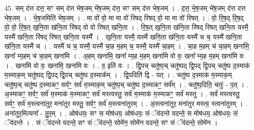 \documentclass[17pt]{extarticle}
\begin{document}
45. सम् द॑त्त दत्त॒ सꣳ सम् द॑त्त भेष॒जम् भे॑ष॒जम् द॑त्त॒ सꣳ सम् द॑त्त भेष॒जम् । . द॒त्त॒ भे॒ष॒जम् भे॑ष॒जम् द॑त्त दत्त भेष॒जम् । . भे॒ष॒जमिति॑ भेष॒जम् । . मा वो॑ वो॒ मा मा वो॑ रिषद् रिषद् वो॒ मा मा वो॑ रिषत् । . वो॒ रि॒ष॒द् रि॒ष॒द् वो॒ वो॒ रि॒ष॒त् ख॒नि॒ता ख॑नि॒ता रि॑षद् वो वो रिषत् खनि॒ता । . रि॒ष॒त् ख॒नि॒ता ख॑नि॒ता रि॑षद् रिषत् खनि॒ता यस्मै॒ यस्मै॑ खनि॒ता रि॑षद् रिषत् खनि॒ता यस्मै᳚ । . ख॒नि॒ता यस्मै॒ यस्मै॑ खनि॒ता ख॑नि॒ता यस्मै॑ च च॒ यस्मै॑ खनि॒ता ख॑नि॒ता यस्मै॑ च । . यस्मै॑ च च॒ यस्मै॒ यस्मै॑ चा॒ह म॒हम् च॒ यस्मै॒ यस्मै॑ चा॒हम् । . चा॒ह म॒हम् च॑ चा॒हम् खना॑मि॒ खना᳚ म्य॒हम् च॑ चा॒हम् खना॑मि । . अ॒हम् खना॑मि॒ खना᳚ म्य॒ह म॒हम् खना॑मि वो वः॒ खना᳚ म्य॒ह म॒हम् खना॑मि वः । . खना॑मि वो वः॒ खना॑मि॒ खना॑मि वः । . व॒ इति॑ वः । . द्वि॒पच् चतु॑ष्प॒च् चतु॑ष्पद् द्वि॒पद् द्वि॒पच् चतु॑ष्प द॒स्माक॑ म॒स्माक॒म् चतु॑ष्पद् द्वि॒पद् द्वि॒पच् चतु॑ष्प द॒स्माक᳚म् । . द्वि॒पदिति॑ द्वि - पत् । . चतु॑ष्प द॒स्माक॑ म॒स्माक॒म् चतु॑ष्प॒च् चतु॑ष्प द॒स्माकꣳ॒॒ सर्वꣳ॒॒ सर्व॑ म॒स्माक॒म् चतु॑ष्प॒च् चतु॑ष्प द॒स्माकꣳ॒॒ सर्व᳚म् । . चतु॑ष्प॒दिति॒ चतुः॑ - प॒त् । . अ॒स्माकꣳ॒॒ सर्वꣳ॒॒ सर्व॑ म॒स्माक॑ म॒स्माकꣳ॒॒ सर्व॑ मस्त्वस्तु॒ सर्व॑ म॒स्माक॑ म॒स्माकꣳ॒॒ सर्व॑ मस्तु । . सर्व॑ मस्त्वस्तु॒ सर्वꣳ॒॒ सर्व॑ म॒स्त्वना॑तुर॒ मना॑तुर मस्तु॒ सर्वꣳ॒॒ सर्व॑ म॒स्त्वना॑तुरम् । . अ॒स्त्वना॑तुर॒ मना॑तुर मस्त्व॒ स्त्वना॑तुरम् । . अना॑तुर॒मित्यना᳚ - तु॒र॒म् । . ओष॑धयः॒ सꣳ स मोष॑धय॒ ओष॑धयः॒ सं ॅव॑दन्ते वदन्ते॒ स मोष॑धय॒ ओष॑धयः॒ सं ॅव॑दन्ते । . सं ॅव॑दन्ते वदन्ते॒ सꣳ सं ॅव॑दन्ते॒ सोमे॑न॒ सोमे॑न वदन्ते॒ सꣳ सं ॅव॑दन्ते॒ सोमे॑न । \newline
\end{document}
